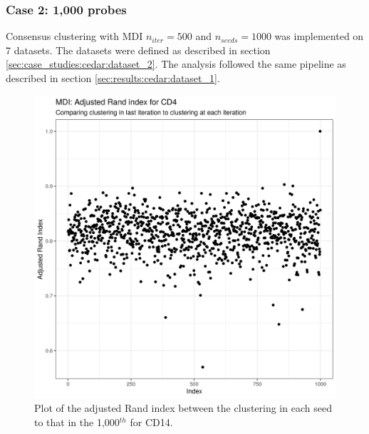 \documentclass[12pt]{article} %
\begin{document}
	
%	
	
	\subsubsection{Case 2: 1,000 probes} \label{sec:results:cedar:dataset_2}
	Consensus clustering with MDI $n_{iter}=500$ and $n_{seeds}=1000$ was implemented on 7 datasets. The datasets were defined as described in section \ref{sec:case_studies:cedar:dataset_2}. The analysis followed the same pipeline as described in section \ref{sec:results:cedar:dataset_1}.
	
	
	\begin{figure}[h]
		\centering
		\includegraphics[scale=0.75]{Images/Biology_data/Set_1000/All_datasets/Adjusted_rand_index_plots/rand_index_plot_CD4.png}
		\caption{Plot of the adjusted Rand index between the clustering in each seed to that in the 1,000$^{th}$ for CD14.}
		\label{fig:results:cedar_2:mdi_cd4_adj_rand_ind_plot}
	\end{figure}
	
\end{document}
